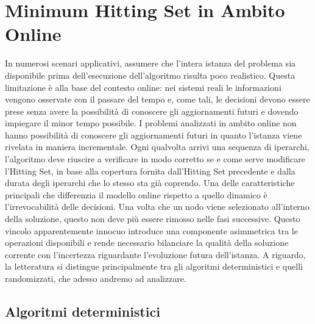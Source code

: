 
\section{Minimum Hitting Set in Ambito Online}\label{sec:minimum_hitting_set_in_ambito_online}

In numerosi scenari applicativi, assumere che l'intera istanza del problema sia disponibile prima dell'esecuzione dell'algoritmo risulta poco realistico.
Questa limitazione è alla base del contesto online: nei sistemi reali le informazioni vengono osservate con il passare del tempo e, come tali, le decisioni devono essere prese senza avere la possibilità di conoscere gli aggiornamenti futuri e dovendo impiegare il minor tempo possibile.
I problemi analizzati in ambito online non hanno possibilità di conoscere gli aggiornamenti futuri in quanto l'istanza viene rivelata in maniera incrementale.
Ogni qualvolta arrivi una sequenza di iperarchi, l'algoritmo deve riuscire a verificare in modo corretto se e come serve modificare l'Hitting Set, in base alla copertura fornita dall'Hitting Set precedente e dalla durata degli iperarchi che lo stesso sta già coprendo.
Una delle caratteristiche principali che differenzia il modello online rispetto a quello dinamico è l'irrevocabilità delle decisioni.
Una volta che un nodo viene selezionato all'interno della soluzione, questo non deve più essere rimosso nelle fasi successive.
Questo vincolo apparentemente innocuo introduce una componente asimmetrica tra le operazioni disponibili e rende necessario bilanciare la qualità della soluzione corrente con l'incertezza riguardante l'evoluzione futura dell'istanza.
A riguardo, la letteratura si distingue principalmente tra gli algoritmi deterministici e quelli randomizzati, che adesso andremo ad analizzare.

\subsection*{Algoritmi deterministici}

